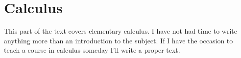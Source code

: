 \part{Calculus}

This part of the text covers elementary calculus.  I have not had time to 
write anything more than an introduction to the subject.  If I have 
the occasion to teach a course in calculus someday I'll write a proper text.






